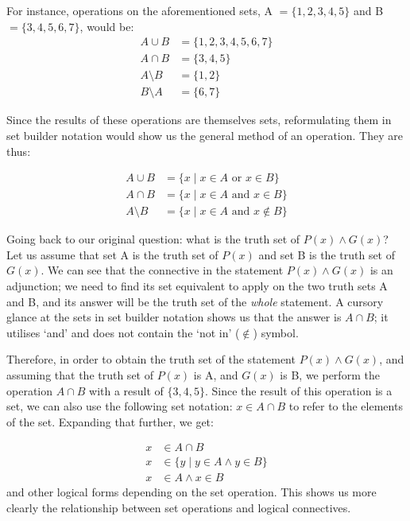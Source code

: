 \documentclass[a4paper, 11pt]{article}
\begin{document}
For instance, operations on the aforementioned sets, A $= \{1, 2, 3, 4, 5\}$ and B $=\{3, 4, 5, 6, 7\}$, would be:
\begin{align*}
  A \cup B & = \{1, 2, 3, 4, 5, 6, 7\}
  \\ A \cap B &= \{3, 4, 5\}
  \\ A \setminus B &= \{1, 2\}
  \\ B \setminus A &= \{6, 7\}
\end{align*}

Since the results of these operations are themselves sets, reformulating them in set builder notation would show us the general method of an operation. They are thus:

\begin{align*}
  A \cup B      & = \{x \mid x \in A \text{ or } x \in B\}      \\
  A \cap B      & = \{x \mid x \in A \text{ and } x \in B\}     \\
  A \setminus B & = \{x \mid x \in A \text{ and } x \notin B \}
\end{align*}

Going back to our original question: what is the truth set of $P(x) \wedge G(x)$? Let us assume that set A is the truth set of $P(x)$ and set B is the truth set of $G(x)$. We can see that the connective in the statement $P(x) \wedge G(x)$ is an adjunction; we need to find its set equivalent to apply on the two truth sets A and B, and its answer will be the truth set of the \textit{whole} statement. A cursory glance at the sets in set builder notation shows us that the answer is $A \cap B$; it utilises `and' and does not contain the `not in' ($\notin$) symbol.

Therefore, in order to obtain the truth set of the statement $P(x) \wedge G(x)$, and assuming that the truth set of $P(x)$ is A, and $G(x)$ is B, we perform the operation $A \cap B$ with a result of $\{3, 4, 5\}$. Since the result of this operation is a set, we can also use the following set notation: $x \in A \cap B$ to refer to the elements of the set. Expanding that further, we get:

\begin{align*}
  x & \in A \cap B                          \\
  x & \in \{y \mid y \in A \wedge y \in B\} \\
  x & \in A \wedge x \in B
\end{align*}
and other logical forms depending on the set operation. This shows us more clearly the relationship between set operations and logical connectives.
\end{document}
